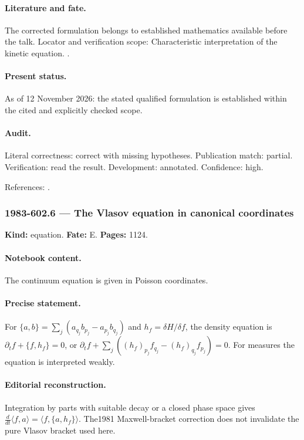 \paragraph{Literature and fate.} The corrected formulation belongs to established mathematics available before the talk. Locator and verification scope: Characteristic interpretation of the kinetic equation. \cite{morrison1980maxwell}.

\paragraph{Present status.} As of 12 November 2026: the stated qualified formulation is established within the cited and explicitly checked scope.

\paragraph{Audit.} Literal correctness: correct with missing hypotheses. Publication match: partial. Verification: read the result. Development: annotated. Confidence: high.

\noindent References: \citep{morrison1980maxwell}.\par

\subsubsection{1983-602.6 --- The Vlasov equation in canonical coordinates}

\label{item:1983-602.6}

\noindent\textbf{Kind:} equation. \textbf{Fate:} E. \textbf{Pages:} 1124.\par

\paragraph{Notebook content.} The continuum equation is given in Poisson coordinates.

\paragraph{Precise statement.} For \(\{a,b\}=\sum_j(a_{q_j}b_{p_j}-a_{p_j}b_{q_j})\) and \(h_f=\delta H/\delta f\), the density equation is \(\partial_tf+\{f,h_f\}=0\), or \(\partial_tf+\sum_j((h_f)_{p_j}f_{q_j}-(h_f)_{q_j}f_{p_j})=0\). For measures the equation is interpreted weakly.

\paragraph{Editorial reconstruction.} Integration by parts with suitable decay or a closed phase space gives \(\frac d{dt}\langle f,a\rangle=\langle f,\{a,h_f\}\rangle\). The1981 Maxwell-bracket correction does not invalidate the pure Vlasov bracket used here.

